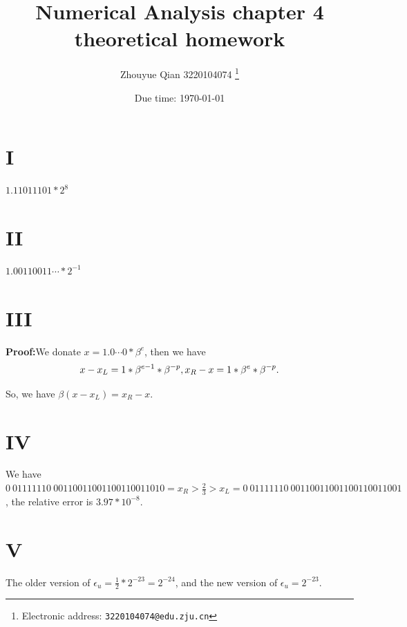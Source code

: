 \documentclass[a4paper]{article}
\begin{document}
\title{Numerical Analysis chapter 4 theoretical homework}

\author{Zhouyue Qian 3220104074
  \thanks{Electronic address: \texttt{3220104074@edu.zju.cn}}}


\date{Due time: \today}

\maketitle






\section*{I}
$1.11011101*2^{8}$

\section*{II}
$1.00110011 \cdots *2^{-1} $

\section*{III}
\textbf{Proof:}We donate $x = 1.0 \cdots 0 * \beta^{e}$, then we have 
$$x-x_{L} = 1*\beta^{e-1}*\beta^{-p},\\
x_{R}-x = 1*\beta^{e}*\beta^{-p}.$$

So, we have $\beta (x-x_{L}) = x_{R}-x$.

\section*{IV}
We have $0 \ 01111110\ 00110011001100110011010 = x_{R}>\frac{2}{3}>x_{L} = 0 \ 01111110\ 00110011001100110011001$, the relative error is $3.97*10^{-8}$.

\section*{V}
The older version of $\epsilon_u = \frac{1}{2}*2^{-23} = 2^{-24} $, and the new version of $\epsilon_u = 2^{-23}$. 
\end{document}
